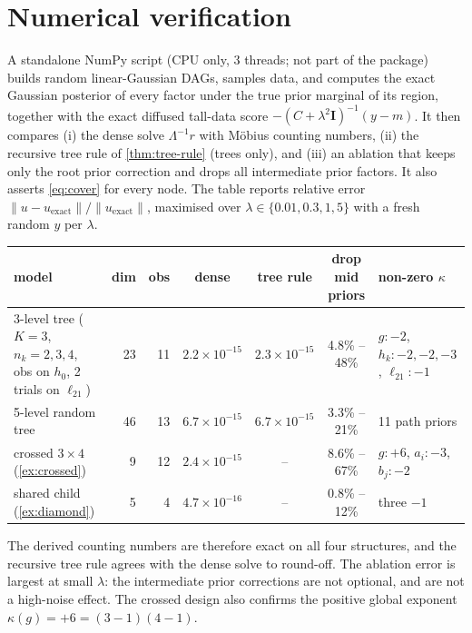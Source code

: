 \documentclass[11pt]{article}
\theoremstyle{definition}
\theoremstyle{remark}
\newcommand{\I}{\mathbf{I}}
\newcommand{\lam}{\lambda}
\begin{document}
\section{Numerical verification}\label{sec:numerics}

A standalone NumPy script (CPU only, 3 threads; not part of the package) builds
random linear-Gaussian DAGs, samples data, and computes the exact Gaussian
posterior of every factor under the true prior marginal of its region, together
with the exact diffused tall-data score $-(C+\lam^2\I)^{-1}(y-m)$. It then
compares (i) the dense solve $\Lambda^{-1}r$ with Möbius counting numbers,
(ii) the recursive tree rule of \cref{thm:tree-rule} (trees only), and (iii) an
ablation that keeps only the root prior correction and drops all intermediate
prior factors. It also asserts \eqref{eq:cover} for every node. The table
reports relative error $\|u-u_\text{exact}\|/\|u_\text{exact}\|$, maximised over
$\lam\in\{0.01,0.3,1,5\}$ with a fresh random $y$ per $\lam$.

\begin{center}\small
\setlength{\tabcolsep}{4pt}
\begin{tabular}{@{}p{3.9cm}rrccc p{2.9cm}@{}}
\toprule
model & dim & obs & dense & tree rule & drop mid priors & non-zero $\kappa$\\
\midrule
3-level tree ($K=3$, $n_k=2,3,4$, obs on $h_0$, 2 trials on $\ell_{21}$) & 23 & 11 & $2.2\times10^{-15}$ & $2.3\times10^{-15}$ & 4.8\% -- 48\% & $g{:}{-}2$, $h_k{:}{-}2,{-}2,{-}3$, $\ell_{21}{:}{-}1$\\
5-level random tree & 46 & 13 & $6.7\times10^{-15}$ & $6.7\times10^{-15}$ & 3.3\% -- 21\% & 11 path priors\\
crossed $3\times4$ (\cref{ex:crossed}) & 9 & 12 & $2.4\times10^{-15}$ & -- & 8.6\% -- 67\% & $g{:}{+}6$, $a_i{:}{-}3$, $b_j{:}{-}2$\\
shared child (\cref{ex:diamond}) & 5 & 4 & $4.7\times10^{-16}$ & -- & 0.8\% -- 12\% & three ${-}1$\\
\bottomrule
\end{tabular}
\end{center}

The derived counting numbers are therefore exact on all four structures, and the
recursive tree rule agrees with the dense solve to round-off. The ablation error
is largest at small $\lam$: the intermediate prior corrections are not optional,
and are not a high-noise effect. The crossed design also confirms the positive
global exponent $\kappa(g)=+6=(3-1)(4-1)$.
\end{document}
